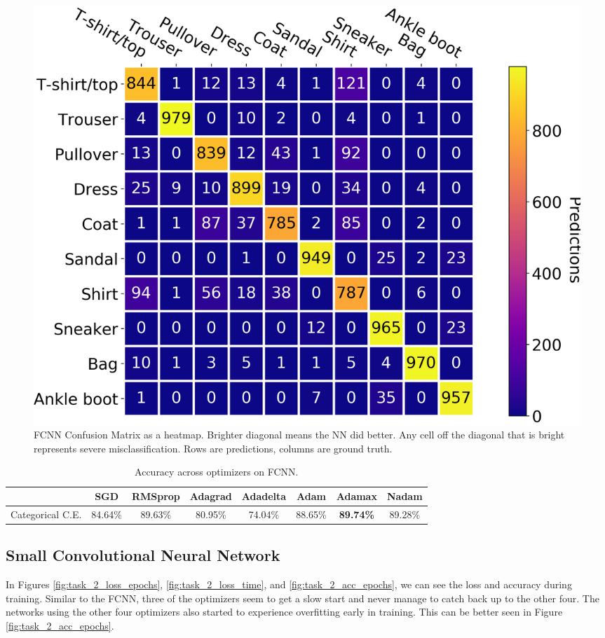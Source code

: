 \documentclass[12pt]{article}
\begin{document}
\begin{figure}
  \centering
  \includegraphics[width=\linewidth]{task_1_cm.png}
  \caption{FCNN Confusion Matrix as a heatmap. Brighter diagonal means the NN did better. Any cell off
   the diagonal that is bright represents severe misclassification. Rows are predictions, columns are ground truth.}
  \label{fig:task_1_cm}
\end{figure}

\begin{table}[]
  \centering
  \caption{Accuracy across optimizers on FCNN.}
  \label{tab:FCNN}
  \begin{tabular}{|c|c|c|c|c|c|c|c|}
  \hline
   & SGD & RMSprop & Adagrad & Adadelta & Adam & Adamax & Nadam \\ \hline
   Categorical C.E. & 84.64\% & 89.63\% & 80.95\% & 74.04\% & 88.65\% & \textbf{89.74\%} & 89.28\% \\ \hline
  \end{tabular}
  \end{table}


\subsection{Small Convolutional Neural Network}

In Figures \ref{fig:task_2_loss_epochs}, \ref{fig:task_2_loss_time}, and \ref{fig:task_2_acc_epochs}, we can see
 the loss and accuracy during training.
Similar to the FCNN, three of the optimizers seem to get a slow start and never manage to catch back up to the other four.
The networks using the other four optimizers also started to experience overfitting early in training.
This can be better seen in Figure \ref{fig:task_2_acc_epochs}.
\end{document}
